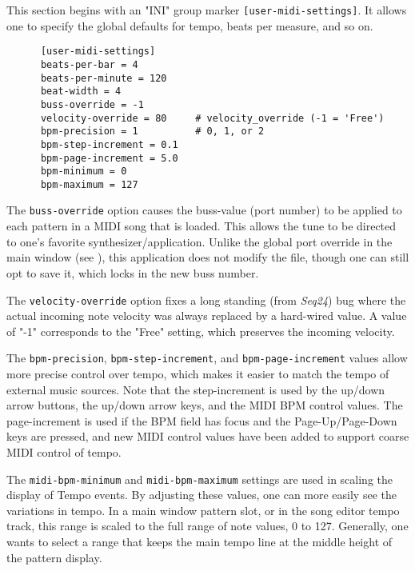    This section begins with an
   "INI" group marker \texttt{[user-midi-settings]}.
   It allows one to specify the
   global defaults for tempo, beats per measure, and so on.

   \begin{verbatim}
      [user-midi-settings]
      beats-per-bar = 4
      beats-per-minute = 120
      beat-width = 4
      buss-override = -1
      velocity-override = 80     # velocity_override (-1 = 'Free')
      bpm-precision = 1          # 0, 1, or 2
      bpm-step-increment = 0.1
      bpm-page-increment = 5.0
      bpm-minimum = 0
      bpm-maximum = 127
   \end{verbatim}

   The \texttt{buss-override} option causes the buss-value (port number) to be
   applied to each pattern in a MIDI song that is loaded.  This allows the tune
   to be directed to one's favorite synthesizer/application.
   Unlike the global port override in the main window
   (see ),
   this application does not modify the file, though one can still opt to save
   it, which locks in the new buss number.

   The \texttt{velocity-override} option fixes a long standing (from
   \textsl{Seq24}) bug where the actual incoming note velocity was always
   replaced by a hard-wired value.  A value of "-1" corresponds to the "Free"
   setting, which preserves the incoming velocity.

   The \texttt{bpm-precision}, \texttt{bpm-step-increment}, and
   \texttt{bpm-page-increment} values allow more precise control over tempo,
   which makes it easier to match the tempo of external music sources.  Note
   that the step-increment is used by the up/down arrow buttons, the up/down
   arrow keys, and the MIDI BPM control values.  The page-increment is used
   if the BPM field has focus and the Page-Up/Page-Down keys are pressed,
   and new MIDI control values have been added to support coarse MIDI
   control of tempo.

   The \texttt{midi-bpm-minimum} and \texttt{midi-bpm-maximum} settings
   are used in scaling the display of Tempo events.
   By adjusting these values, one can more easily see the variations in
   tempo.  In a main window pattern slot, or in the song editor tempo track,
   this range is scaled to the full range of note values, 0 to 127.
   Generally, one wants to select a range that keeps the main tempo line at
   the middle height of the pattern display.

